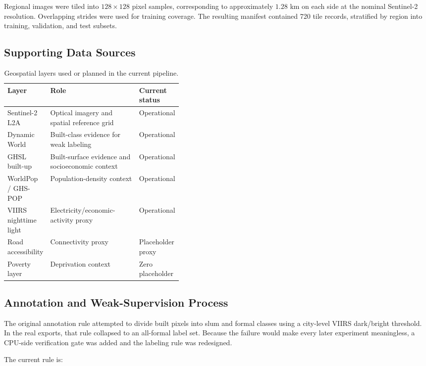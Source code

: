 \documentclass[11pt,a4paper]{article}
\begin{document}
Regional images were tiled into \(128\times128\) pixel samples, corresponding to approximately \(1.28\) km on each side at the nominal Sentinel-2 resolution. Overlapping strides were used for training coverage. The resulting manifest contained 720 tile records, stratified by region into training, validation, and test subsets.

\subsection{Supporting Data Sources}

\begin{table}[H]
\centering
\caption{Geospatial layers used or planned in the current pipeline.}
\begin{tabularx}{\linewidth}{p{0.22\linewidth}Yp{0.19\linewidth}}
\toprule
\textbf{Layer} & \textbf{Role} & \textbf{Current status}\\
\midrule
Sentinel-2 L2A & Optical imagery and spatial reference grid & Operational\\
Dynamic World & Built-class evidence for weak labeling & Operational\\
GHSL built-up & Built-surface evidence and socioeconomic context & Operational\\
WorldPop / GHS-POP & Population-density context & Operational\\
VIIRS nighttime light & Electricity/economic-activity proxy & Operational\\
Road accessibility & Connectivity proxy & Placeholder proxy\\
Poverty layer & Deprivation context & Zero placeholder\\
\bottomrule
\end{tabularx}
\end{table}

\subsection{Annotation and Weak-Supervision Process}

The original annotation rule attempted to divide built pixels into slum and formal classes using a city-level VIIRS dark/bright threshold. In the real exports, that rule collapsed to an all-formal label set. Because the failure would make every later experiment meaningless, a CPU-side verification gate was added and the labeling rule was redesigned.

The current rule is:
\end{document}
